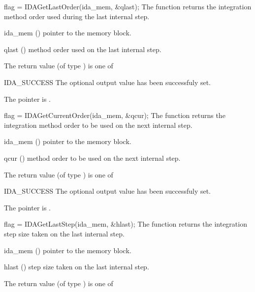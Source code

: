 {{}
{}
{
  flag = IDAGetLastOrder(ida\_mem, \&qlast);
}
{
  The function  returns the
  integration method order used during the last internal step.
}
{
  \begin{args}
  \item[ida\_mem] ()
    pointer to the {\ida} memory block.
  \item[qlast] ()
    method order used on the last internal step.
  \end{args}
}
{
  The return value  (of type ) is one of
  \begin{args}
  \item[IDA\_SUCCESS] 
    The optional output value has been successfuly set.
  \item[\Id{IDA\_MEM\_NULL}]
    The  pointer is .
  \end{args}
}
{}
{
  flag = IDAGetCurrentOrder(ida\_mem, \&qcur);
}
{
  The function  returns the
  integration method order to be used on the next internal step.
}
{
  \begin{args}
  \item[ida\_mem] ()
    pointer to the {\ida} memory block.
  \item[qcur] ()
    method order to be used on the next internal step.
  \end{args}
}
{
  The return value  (of type ) is one of
  \begin{args}
  \item[IDA\_SUCCESS] 
    The optional output value has been successfuly set.
  \item[\Id{IDA\_MEM\_NULL}]
    The  pointer is .
  \end{args}
}
{}
{
  flag = IDAGetLastStep(ida\_mem, \&hlast);
}
{
  The function  returns the
  integration step size taken on the last internal step.
}
{
  \begin{args}
  \item[ida\_mem] ()
    pointer to the {\ida} memory block.
  \item[hlast] ()
    step size taken on the last internal step.
  \end{args}
}
{
  The return value  (of type ) is one of
  \begin{args}

\end{args}}}
